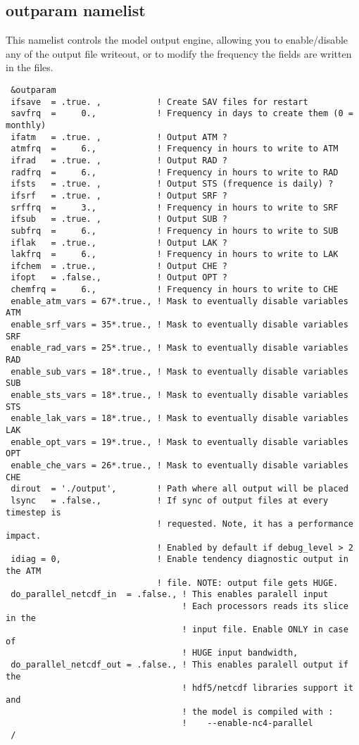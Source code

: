 \subsection{outparam namelist}

This namelist controls the model output engine, allowing you to enable/disable
any of the output file writeout, or to modify the frequency the fields are
written in the files.

{\footnotesize
\begin{Verbatim}
 &outparam
 ifsave  = .true. ,           ! Create SAV files for restart
 savfrq  =     0.,            ! Frequency in days to create them (0 = monthly)
 ifatm   = .true. ,           ! Output ATM ?
 atmfrq  =     6.,            ! Frequency in hours to write to ATM
 ifrad   = .true. ,           ! Output RAD ?
 radfrq  =     6.,            ! Frequency in hours to write to RAD
 ifsts   = .true. ,           ! Output STS (frequence is daily) ?
 ifsrf   = .true. ,           ! Output SRF ?
 srffrq  =     3.,            ! Frequency in hours to write to SRF
 ifsub   = .true. ,           ! Output SUB ?
 subfrq  =     6.,            ! Frequency in hours to write to SUB
 iflak   = .true.,            ! Output LAK ?
 lakfrq  =     6.,            ! Frequency in hours to write to LAK
 ifchem  = .true.,            ! Output CHE ?
 ifopt   = .false.,           ! Output OPT ?
 chemfrq =     6.,            ! Frequency in hours to write to CHE
 enable_atm_vars = 67*.true., ! Mask to eventually disable variables ATM
 enable_srf_vars = 35*.true., ! Mask to eventually disable variables SRF
 enable_rad_vars = 25*.true., ! Mask to eventually disable variables RAD
 enable_sub_vars = 18*.true., ! Mask to eventually disable variables SUB
 enable_sts_vars = 18*.true., ! Mask to eventually disable variables STS
 enable_lak_vars = 18*.true., ! Mask to eventually disable variables LAK
 enable_opt_vars = 19*.true., ! Mask to eventually disable variables OPT
 enable_che_vars = 26*.true., ! Mask to eventually disable variables CHE
 dirout  = './output',        ! Path where all output will be placed
 lsync   = .false.,           ! If sync of output files at every timestep is
                              ! requested. Note, it has a performance impact.
                              ! Enabled by default if debug_level > 2
 idiag = 0,                   ! Enable tendency diagnostic output in the ATM
                              ! file. NOTE: output file gets HUGE.
 do_parallel_netcdf_in  = .false., ! This enables paralell input
                                   ! Each processors reads its slice in the
                                   ! input file. Enable ONLY in case of
                                   ! HUGE input bandwidth,
 do_parallel_netcdf_out = .false., ! This enables paralell output if the 
                                   ! hdf5/netcdf libraries support it and
                                   ! the model is compiled with :
                                   !    --enable-nc4-parallel
 /
\end{Verbatim}
}

